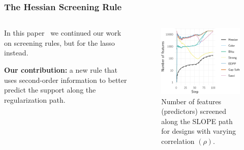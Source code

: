 \documentclass[10pt,aspectratio=169]{beamer}
\begin{document}

\begin{frame}[c]
  \frametitle{The Hessian Screening Rule}
  \begin{columns}
    \begin{column}{0.4\textwidth}
      In this paper~\parencite{larsson2022b} we continued our work on screening rules, but for the lasso instead.\medskip

      \textbf{Our contribution:} a new rule that uses second-order information to better predict the support along the regularization path.
    \end{column}
    \begin{column}{0.5\textwidth}
      \begin{figure}
        \centering
        \includegraphics{figures/hessian-simulateddata-efficiency.pdf}
        \caption{%
          Number of features (predictors) screened along the SLOPE path for designs with varying correlation \((\rho)\).
        }
      \end{figure}
    \end{column}
  \end{columns}

\end{frame}
\end{document}
